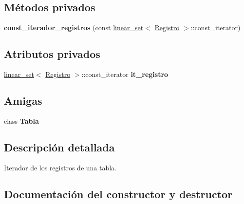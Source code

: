 \subsection*{Métodos privados}
\begin{DoxyCompactItemize}
\item 
\mbox{\label{classTabla_1_1const__iterador__registros_a8dde708af2d71cf5dabfd3b42d15284f}} 
{\bfseries const\+\_\+iterador\+\_\+registros} (const \mbox{\hyperlink{classlinear__set}{linear\+\_\+set}}$<$ \mbox{\hyperlink{classRegistro}{Registro}} $>$\+::const\+\_\+iterator)
\end{DoxyCompactItemize}
\subsection*{Atributos privados}
\begin{DoxyCompactItemize}
\item 
\mbox{\label{classTabla_1_1const__iterador__registros_ab650d9f113456460fca266d31dffa484}} 
\mbox{\hyperlink{classlinear__set}{linear\+\_\+set}}$<$ \mbox{\hyperlink{classRegistro}{Registro}} $>$\+::const\+\_\+iterator {\bfseries it\+\_\+registro}
\end{DoxyCompactItemize}
\subsection*{Amigas}
\begin{DoxyCompactItemize}
\item 
\mbox{\label{classTabla_1_1const__iterador__registros_a172484163cb8b80140c3053a4c68e4da}} 
class {\bfseries Tabla}
\end{DoxyCompactItemize}


\subsection{Descripción detallada}
Iterador de los registros de una tabla. 

\subsection{Documentación del constructor y destructor}
\mbox{\label{classTabla_1_1const__iterador__registros_a904a84af50ced6c3d9e77e10d6e5192a}} 
